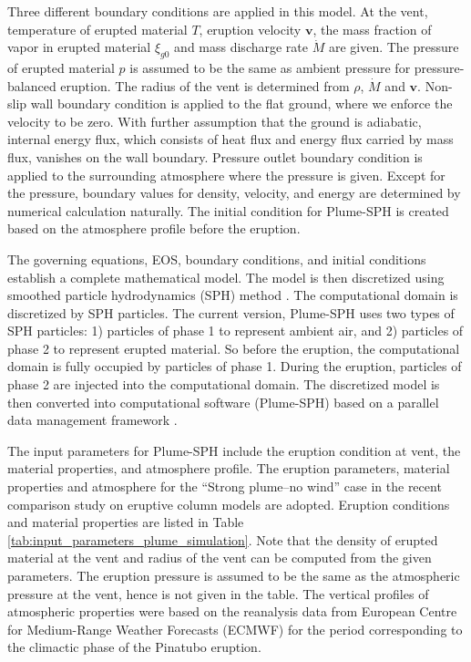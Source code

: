 \documentclass[utf8]{frontiersSCNS} %
\begin{document}
Three different boundary conditions are applied in this model. At the vent, temperature of erupted material $T$, eruption velocity $\textbf{v}$, the mass fraction of vapor in erupted material $\xi_{g0}$ and mass discharge rate $\dot M$ are given. The pressure of erupted material $p$ is assumed to be the same as ambient pressure for pressure-balanced eruption. The radius of the vent is determined from $\rho$, $\dot M$ and $\textbf{v}$.  Non-slip wall boundary condition is applied to the flat ground, where we enforce the velocity to be zero. With further assumption that the ground is adiabatic, internal energy flux, which consists of heat flux and energy flux carried by mass flux, vanishes on the wall boundary. Pressure outlet boundary condition is applied to the surrounding atmosphere where the pressure is given. Except for the pressure,  boundary values for density, velocity, and energy are determined by numerical calculation naturally. The initial condition for Plume-SPH is created based on the atmosphere profile before the eruption. 

The governing equations,  EOS, boundary conditions, and initial conditions establish a complete mathematical model. The model is then discretized using smoothed particle hydrodynamics (SPH) method \citep{gingold1977smoothed}. The computational domain is discretized by SPH particles. The current version, Plume-SPH \citep{cao2018plume} uses two types of SPH particles: 1) particles of phase 1 to represent ambient air, and 2) particles of phase 2 to represent erupted material. So before the eruption, the computational domain is fully occupied by particles of phase 1. During the eruption, particles of phase 2 are injected into the computational domain. The discretized model is then converted into computational software (Plume-SPH) based on a parallel data management framework \citep{cao2017data}.

The input parameters for Plume-SPH include the eruption condition at vent, the material properties, and atmosphere profile. The eruption parameters, material properties and atmosphere for the ``Strong plume--no wind'' case in the recent comparison study on eruptive column models \citep {costa2016results} are adopted. Eruption conditions and material properties are listed in Table \ref{tab:input_parameters_plume_simulation}. Note that the density of erupted material at the vent and radius of the vent can be computed from the given parameters. The eruption pressure is assumed to be the same as the atmospheric pressure at the vent, hence is not given in the table. The vertical profiles of atmospheric properties were  based on the reanalysis data from European Centre for Medium-Range Weather Forecasts (ECMWF) for the period corresponding to the climactic phase of the Pinatubo eruption. 
\end{document}
